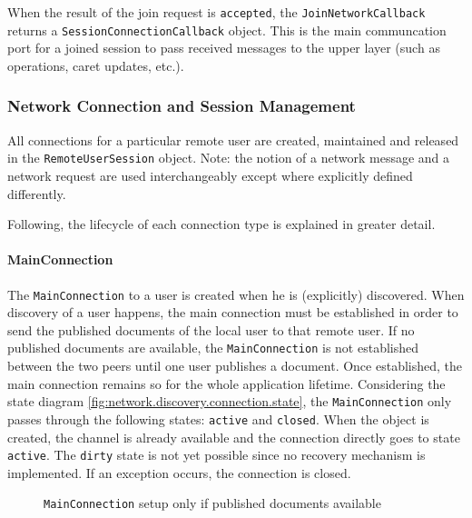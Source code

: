 When the result of the join request is  \texttt{accepted}, the \texttt{JoinNetworkCallback} returns a \texttt{Session\-Connection\-Callback} object. This is the main communcation port for a joined session to pass received messages to the upper layer (such as operations, caret updates, etc.).


\subsubsection{Network Connection and Session Management}
All connections for a particular remote user are created, maintained and released in the \texttt{RemoteUserSession} object. Note: the notion of a network message and a network request are used interchangeably except where explicitly defined differently.

Following, the lifecycle of each connection type is explained in greater detail.

\paragraph{MainConnection}
The \texttt{MainConnection} to a user is created when he is (explicitly) discovered. When discovery of a user happens, the main connection must be established in order to send the published documents of the local user to that remote user. If no published documents are available, the \texttt{MainConnection} is not established between the two peers until one user publishes a document. Once established, the main connection remains so for the whole application lifetime. Considering the state diagram \ref{fig:network.discovery.connection.state}, the \texttt{MainConnection} only passes through the following states: \texttt{active} and \texttt{closed}. When the object is created, the channel is already available and the connection directly goes to state  \texttt{active}. The \texttt{dirty} state is not yet possible since no recovery mechanism is implemented. If an exception occurs, the connection is closed.

\begin{figure}[H]
 \centering
 \caption{\texttt{MainConnection} setup only if published documents available}
 \label{fig:network.protocol.mainconnectionsetup}
\end{figure}

